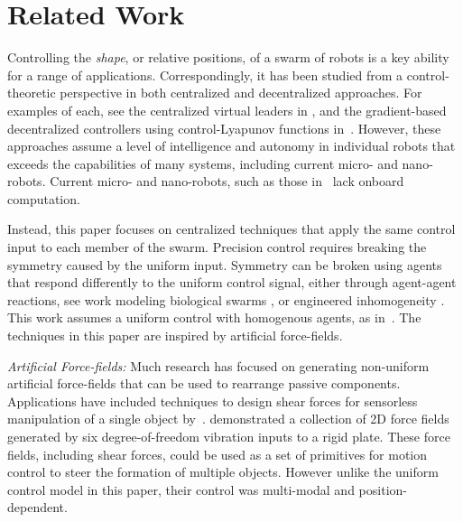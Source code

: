 
\section{Related Work}\label{sec:RelatedWork}

Controlling the \emph{shape}, or relative positions, of a swarm of robots is a key ability for a range of applications.  Correspondingly, it has been studied from a control-theoretic perspective in  both centralized and decentralized approaches. For examples of each, see the centralized virtual leaders in \cite{egerstedt2001formation}, and the  gradient-based decentralized controllers  using control-Lyapunov functions in~\cite{hsieh2008decentralized}. However, these approaches assume a level of intelligence and autonomy in individual robots that exceeds the capabilities of many systems, including current micro- and nano-robots.  Current micro- and nano-robots, such as those in~\cite{Chowdhury2015,martel2015magnetotactic,Xiaohui2015magnetiteMicroswimmers} lack onboard computation.

Instead, this paper focuses on centralized techniques that apply the same control input to each member of the swarm. 
Precision control requires breaking the symmetry caused by the uniform input.  
Symmetry can be broken using agents that respond differently to the uniform control signal, either through agent-agent reactions, see work modeling biological swarms \cite{bertozzi2015ring}, or engineered inhomogeneity  \cite{Donald2013,bretl2007,beckerIJRR2014}.
This work assumes a uniform control with homogenous agents, as in~\cite{Becker2013b}. 
The techniques in this paper are inspired by artificial force-fields. 


\emph{Artificial Force-fields:}
Much research has focused on generating non-uniform artificial force-fields that can be used to rearrange passive components.  Applications have included techniques to design shear forces for sensorless manipulation of a single object by~\cite{lamiraux+2001:ra}.  
\cite{vose2012sliding} demonstrated a collection of 2D force fields generated by six degree-of-freedom vibration inputs to a rigid plate.  These force fields, including shear forces, could be used as a set of primitives for motion control to steer the formation of multiple objects. However unlike the uniform control model in this paper, their control was multi-modal and position-dependent.

